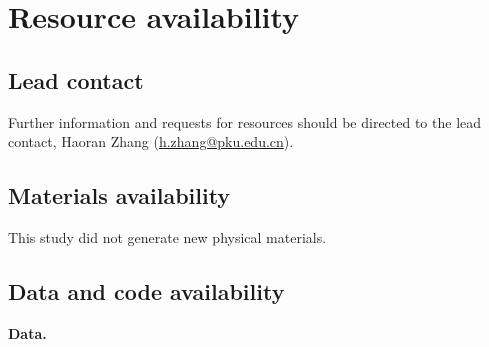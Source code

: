 \documentclass[11pt,a4paper]{article}
\begin{document}
\section*{Resource availability}

\subsection*{Lead contact}

Further information and requests for resources should be directed to the lead contact, Haoran Zhang (\href{mailto:h.zhang@pku.edu.cn}{h.zhang@pku.edu.cn}).

\subsection*{Materials availability}

This study did not generate new physical materials.

\subsection*{Data and code availability}

\noindent\textbf{Data.}
\end{document}
